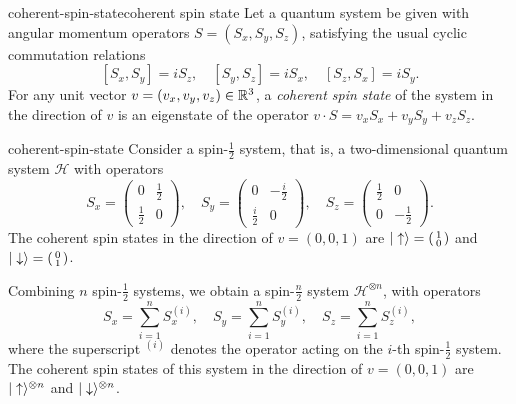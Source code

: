\begin{topic}{coherent-spin-state}{coherent spin state}
    Let a quantum system be given with angular momentum operators $S = (S_x, S_y, S_z)$, satisfying the usual cyclic commutation relations
    \[ [S_x, S_y] = i S_z, \quad [S_y, S_z] = i S_x, \quad [S_z, S_x] = i S_y . \]
    For any unit vector $v = (v_x, v_y, v_z) \in \mathbb{R}^3$, a \emph{coherent spin state} of the system in the direction of $v$ is an eigenstate of the operator $v \cdot S = v_x S_x + v_y S_y + v_z S_z$.
\end{topic}

\begin{example}{coherent-spin-state}
    Consider a spin-$\tfrac{1}{2}$ system, that is, a two-dimensional quantum system $\mathcal{H}$ with operators
    \[ S_x = \begin{pmatrix} 0 & \tfrac{1}{2} \\ \tfrac{1}{2} & 0 \end{pmatrix}, \quad S_y = \begin{pmatrix} 0 & - \tfrac{i}{2} \\ \tfrac{i}{2} & 0 \end{pmatrix}, \quad S_z = \begin{pmatrix} \tfrac{1}{2} & 0 \\ 0 & - \tfrac{1}{2} \end{pmatrix} . \]
    The coherent spin states in the direction of $v = (0, 0, 1)$ are $|\uparrow\rangle = \left(\begin{smallmatrix} 1 \\ 0 \end{smallmatrix}\right)$ and $|\downarrow\rangle = \left(\begin{smallmatrix} 0 \\ 1 \end{smallmatrix}\right)$.

    Combining $n$ spin-$\tfrac{1}{2}$ systems, we obtain a spin-$\tfrac{n}{2}$ system $\mathcal{H}^{\otimes n}$, with operators
    \[ S_x = \sum_{i = 1}^{n} S_x^{(i)}, \quad S_y = \sum_{i = 1}^{n} S_y^{(i)}, \quad S_z = \sum_{i = 1}^{n} S_z^{(i)} , \]
    where the superscript $^{(i)}$ denotes the operator acting on the $i$-th spin-$\tfrac{1}{2}$ system. The coherent spin states of this system in the direction of $v = (0, 0, 1)$ are $|\uparrow\rangle^{\otimes n}$ and $|\downarrow\rangle^{\otimes n}$.
\end{example}

